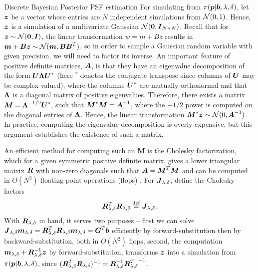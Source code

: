 \begin{chapter}{Discrete Bayesian Posterior PSF estimation}
For simulating from $\pi(\mbox{\boldmath$p$}|\mbox{\boldmath$b$}, \lambda,\delta)$, let $\mbox{\boldmath$z$}$ be a vector whose entries are $N$ independent simulations from $\mathcal{N}(0,1)$. 
Hence, $\mbox{\boldmath$z$}$ is a simulation of a multivariate Gaussian $\mathcal{N}(\mbox{\boldmath$0$},\mbox{\boldmath$I$}_{N\times N})$.
Recall that for $\mbox{\boldmath$z$} \sim \mathcal{N}(\mbox{\boldmath$0$},\mbox{\boldmath$I$})$, the linear transformation $w = m + Bz$ results in $\mbox{\boldmath$m$} + \mbox{\boldmath$B$} \mbox{\boldmath$z$} \sim \mathcal{N}(\mbox{\boldmath$m$}, \mbox{\boldmath$B$}\mbox{\boldmath$B$}^T)$, so in order to sample a Gaussian random variable with given precision, we will need to factor its inverse.
An important feature of positive definite matrices, $\mbox{\boldmath$A$}$, is that they have an eigenvalue decomposition of the form $\mbox{\boldmath$U$} \mbox{\boldmath$\Lambda$} \mbox{\boldmath$U$}^*$ (here $^*$ denotes the conjugate transpose since columns of $\mbox{\boldmath$U$}$ may be complex valued), where the columns $\mbox{\boldmath$U$}^*$ are mutually orthonormal and that $\mbox{\boldmath$\Lambda$}$ is a diagonal matrix of positive eigenvalues.
Therefore, there exists a matrix $\mbox{\boldmath$M$} =  \mbox{\boldmath$\Lambda$}^{-1/2} \mbox{\boldmath$U$}^*$, such that $\mbox{\boldmath$M$}^*\mbox{\boldmath$M$} = \mbox{\boldmath$A$}^{-1}$, where the $-1/2$ power is computed on the diagonal entries of $\mbox{\boldmath$\Lambda$}$.
Hence, the linear transformation $\mbox{\boldmath$M$}^* \mbox{\boldmath$z$} \sim \mathcal{N}(0,\mbox{\boldmath$A$}^{-1})$.  
In practice, computing the eigenvalue decomposition is overly expensive, but this argument establishes the existence of such a matrix.

An efficient method for computing such an $\bm M$ is the Cholesky factorization, which for a given symmetric positive definite matrix, gives a lower triangular matrix $\mbox{\boldmath$R$}$ with non-zero diagonals such that $\mbox{\boldmath$A$} = \mbox{\boldmath$M$}^T\mbox{\boldmath$M$}$ and can be computed in $O(N^3)$ floating-point operations (flops) \citep{golub2012matrix}.
For $\mbox{\boldmath$J$}_{\lambda,\delta}$, define the Cholesky factors
\begin{equation} \label{eq:choleskyJ}
  \mbox{\boldmath$R$}_{\lambda,\delta}^T\mbox{\boldmath$R$}_{\lambda,\delta} \stackrel{\rm def}{=} \mbox{\boldmath$J$}_{\lambda,\delta}.
\end{equation}
With $\mbox{\boldmath$R$}_{\lambda,\delta}$ in hand, it serves two purposes -- first we can solve $\mbox{\boldmath$J$}_{\lambda,\delta} \mbox{\boldmath$m$}_{\lambda,\delta} = \mbox{\boldmath$R$}_{\lambda,\delta}^T\mbox{\boldmath$R$}_{\lambda,\delta} \mbox{\boldmath$m$}_{\lambda,\delta} = \mbox{\boldmath$G$}^T \mbox{\boldmath$b$}$ efficiently by forward-substitution then by backward-substitution, both in $O(N^2)$ flops; second, the computation $\mbox{\boldmath$m$}_{\lambda,\delta} + \mbox{\boldmath$R$}_{\lambda,\delta}^{-1} \mbox{\boldmath$z$}$ by forward-substitution, transforms $\mbox{\boldmath$z$}$ into a simulation from $\pi(\mbox{\boldmath$p$} | \mbox{\boldmath$b$},\lambda,\delta)$,
since $(\mbox{\boldmath$R$}_{\lambda,\delta}^T \mbox{\boldmath$R$}_{\lambda,\delta})^{-1} =\mbox{\boldmath$R$}_{\lambda,\delta}^{-1} {\mbox{\boldmath$R$}_{\lambda,\delta}^T}^{-1}$.


\end{chapter}
